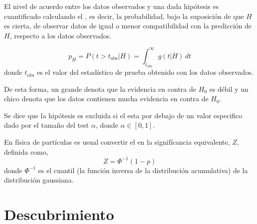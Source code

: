 El nivel de acuerdo entre los datos observados y una dada hipótesis es
cuantificado calculando el \emph{\pvalue}, es decir, la probabilidad, bajo la
suposición de que $H$ es cierta, de observar datos de igual o menor
compatibilidad con la predicción de $H$, respecto a los datos observados.

\begin{equation}
  p_H = P(t>t_\text{obs}|H) = \int_{t_\text{obs}}^{\infty} g(t|H) \, dt
\end{equation}
%
donde $t_\text{obs}$ es el valor del estadístico de prueba obtenido con los
datos observados.

De esta forma, un {\pvalue} grande denota que la evidencia en contra de $H_0$ es
débil y un {\pvalue} chico denota que los datos contienen mucha evidencia en
contra de $H_0$.

Se dice que la hipótesis es excluida si el {\pvalue} esta por debajo de un valor
especifico dado por el tama\~no del test $\alpha$, donde $\alpha \in [0,1]$.

En física de partículas es usual convertir el {\pvalue} en la signifícancia
equivalente, $Z$, definida como,
\begin{equation}
  Z = \Phi^{-1}(1-p)
\end{equation}
%
donde $\Phi^{-1}$ es el cuantil (la función inversa de la distribución
acumulativa) de la distribución gaussiana.





\section{Descubrimiento}

